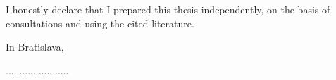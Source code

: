 \newpage
\thispagestyle{empty}

\vspace*{\fill}
\noindent
I honestly declare that I prepared this thesis independently, on the basis of consultations and using the cited literature.

\vspace{1cm}

\noindent
In Bratislava, \myDateEN

\vspace{1.5cm}

\hfill .......................

\hfill \myName

\newpage

\thispagestyle{empty}
\mbox{}
\newpage

